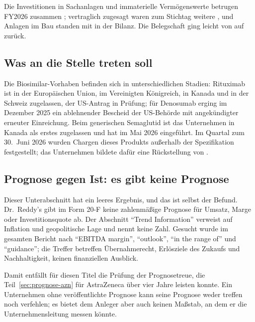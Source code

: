 Die Investitionen in Sachanlagen und immaterielle Verm\"ogenswerte betrugen
FY2026 zusammen \MioINR{\RdyInvestitionen}; vertraglich zugesagt waren zum
Stichtag weitere \MioINR{\RdyInvestVerpflichtung}, und Anlagen im Bau standen
mit \MioINR{\RdyAnlagenBau} in der Bilanz.
Die Belegschaft ging leicht von \Stueck{\RdyMitarbeiterVJ} auf
\Stueck{\RdyMitarbeiter} zur\"uck.

\subsection{Was an die Stelle treten soll}

Die Biosimilar-Vorhaben befinden sich in unterschiedlichen Stadien: Rituximab
ist in der Europ\"aischen Union, im Vereinigten K\"onigreich, in Kanada und in
der Schweiz zugelassen, der US-Antrag in Pr\"ufung; f\"ur Denosumab erging im
Dezember 2025 ein ablehnender Bescheid der US-Beh\"orde mit angek\"undigter
erneuter Einreichung.
Beim generischen Semaglutid ist das Unternehmen in Kanada als erstes
zugelassen und hat im Mai 2026 eingef\"uhrt.
Im Quartal zum 30.~Juni 2026 wurden Chargen dieses Produkts au{\ss}erhalb der
Spezifikation festgestellt; das Unternehmen bildete daf\"ur eine
R\"uckstellung von \MioINR{\RdySemaglutidRueckstellung}.

\subsection{Prognose gegen Ist: es gibt keine Prognose}
\label{sec:prognose-rdy}

Dieser Unterabschnitt hat ein leeres Ergebnis, und das ist selbst der Befund.
Dr.~Reddy's gibt im Form 20-F keine zahlenm\"a{\ss}ige Prognose f\"ur Umsatz,
Marge oder Investitionsquote ab. Der Abschnitt \enquote{Trend Information}
verweist auf Inflation und geopolitische Lage und nennt keine
Zahl.
Gesucht wurde im gesamten Bericht nach \enquote{EBITDA margin},
\enquote{outlook}, \enquote{in the range of} und \enquote{guidance}; die
Treffer betreffen \"Ubernahmerecht, Erl\"osziele des Zukaufs und
Nachhaltigkeit, keinen finanziellen Ausblick.

Damit entf\"allt f\"ur diesen Titel die Pr\"ufung der Prognosetreue, die
Teil~\ref{sec:prognose-azn} f\"ur AstraZeneca \"uber vier Jahre leisten
konnte. Ein Unternehmen ohne ver\"offentlichte Prognose kann seine Prognose
weder treffen noch verfehlen; es bietet dem Anleger aber auch keinen
Ma{\ss}stab, an dem er die Unternehmensleitung messen k\"onnte.

